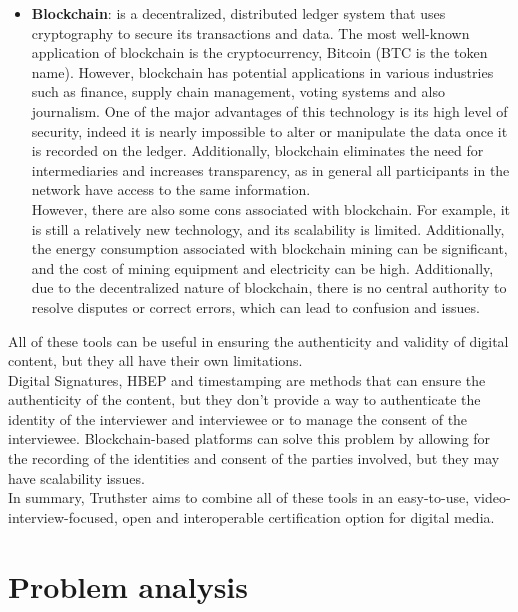 \documentclass[target=mst,aauheader=]{thud}
\begin{document}
\begin{itemize}
    \item \textbf{Blockchain}: is a decentralized, distributed ledger system that uses cryptography to secure its transactions and data. The most well-known application of blockchain is the cryptocurrency, Bitcoin (BTC is the token name). However, blockchain has potential applications in various industries such as finance, supply chain management, voting systems and also journalism. One of the major advantages of this technology is its high level of security, indeed it is nearly impossible to alter or manipulate the data once it is recorded on the ledger. Additionally, blockchain eliminates the need for intermediaries and increases transparency, as in general all participants in the network have access to the same information.\\However, there are also some cons associated with blockchain. For example, it is still a relatively new technology, and its scalability is limited. Additionally, the energy consumption associated with blockchain mining can be significant, and the cost of mining equipment and electricity can be high. Additionally, due to the decentralized nature of blockchain, there is no central authority to resolve disputes or correct errors, which can lead to confusion and issues.

\end{itemize}

All of these tools can be useful in ensuring the authenticity and validity of digital content, but they all have their own limitations.\\
Digital Signatures, HBEP and timestamping are methods that can ensure the authenticity of the content, but they don't provide a way to authenticate the identity of the interviewer and interviewee or to manage the consent of the interviewee. Blockchain-based platforms can solve this problem by allowing for the recording of the identities and consent of the parties involved, but they may have scalability issues.\\

In summary, Truthster aims to combine all of these tools in an easy-to-use, video-interview-focused, open and interoperable certification option for digital media.





\chapter{Problem analysis}
\end{document}
